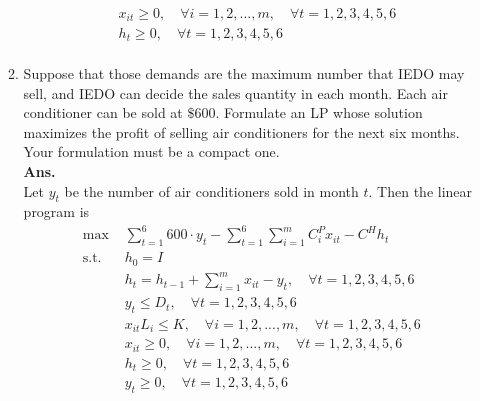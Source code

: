 \documentclass[14pt]{article}
\begin{document}
\begin{enumerate}
\begin{enumerate}
\begin{align*}
                                           & x_{it} \geq 0, \quad \forall i = 1, 2, ..., m, \quad \forall t = 1, 2, 3, 4, 5, 6    \\
                                           & h_t \geq 0, \quad \forall t = 1, 2, 3, 4, 5, 6                                       \\
                        \end{align*}
                  \item Suppose that those demands are the maximum number that IEDO may sell, and IEDO can decide the sales quantity in each month. Each air conditioner can be sold at $\$600$. Formulate an LP whose solution maximizes the profit of selling air conditioners for the next six months. Your formulation must be a compact one.\\
                        \textbf{Ans. }\\
                        Let $y_t$ be the number of air conditioners sold in month $t$. Then the linear program is
                        \begin{align*}
                              \text{max }  & \sum_{t=1}^6 600 \cdot y_t - \sum_{t=1}^6\sum_{i=1}^m C^P_ix_{it} - C^Hh_t           \\
                              \text{s.t. } & h_0 = I                                                                              \\
                                           & h_t = h_{t-1} + \sum_{i=1}^m x_{it} - y_t, \quad \forall t = 1, 2, 3, 4, 5, 6        \\
                                           & y_t \leq D_t, \quad \forall t = 1, 2, 3, 4, 5, 6                                     \\
                                           & x_{it}L_i \leq K, \quad \forall i = 1, 2, ..., m, \quad \forall t = 1, 2, 3, 4, 5, 6 \\
                                           & x_{it} \geq 0, \quad \forall i = 1, 2, ..., m, \quad \forall t = 1, 2, 3, 4, 5, 6    \\
                                           & h_t \geq 0, \quad \forall t = 1, 2, 3, 4, 5, 6                                       \\
                                           & y_t \geq 0, \quad \forall t = 1, 2, 3, 4, 5, 6
                        \end{align*}

\end{enumerate}
\end{enumerate}
\end{document}
